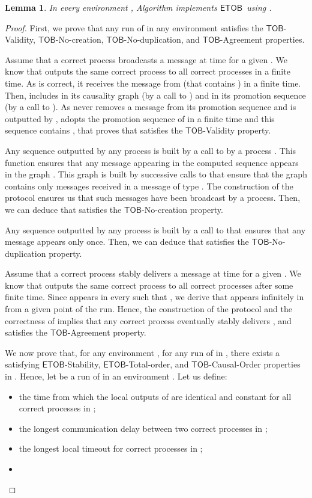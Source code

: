 \documentclass[11pt]{article}
\newtheorem{lemma}{Lemma}
\newcommand{\ETOB}{\ensuremath{\mathsf{ETOB}}}
\newcommand{\TOB}{\ensuremath{\mathsf{TOB}}}
\begin{document}
\begin{lemma}\label{lem:etob}
In every environment , Algorithm  implements \ETOB~using . 
\end{lemma}
\begin{proof}
First, we prove that any run  of  in any environment  satisfies the \TOB-Validity, \TOB-No-creation, \TOB-No-duplication, and \TOB-Agreement properties.

Assume that a correct process  broadcasts a message  at time  for a given . We know that  outputs the same correct process  to all correct processes in a finite time. As  is correct, it receives the message  from  (that contains ) in a finite time. Then,  includes  in its causality graph (by a call to ) and in its promotion sequence (by a call to ). As  never removes a message from its promotion sequence and is outputted by ,  adopts the promotion sequence of  in a finite time and this sequence contains , that proves that  satisfies the \TOB-Validity property.

Any sequence outputted by any process is built by a call to  by a process .  This function ensures that any message appearing in the computed sequence appears in the graph . This graph is built by successive calls to  that ensure that the graph contains only messages received in a message of type . The construction of the protocol ensures us that such messages have been broadcast by a process. Then, we can deduce that  satisfies the \TOB-No-creation property.

Any sequence outputted by any process is built by a call to  that ensures that any message appears only once. Then, we can deduce that  satisfies the \TOB-No-duplication property.

Assume that a correct process  stably delivers a message  at time 
for a given . We know that  outputs the same
correct process  to all correct processes after some finite
time. Since  appears in every  such that , we
derive that  appears infinitely in  from a given point
of the run. Hence, the construction of the protocol and the correctness
of  implies that any correct process eventually stably delivers
, and   satisfies the \TOB-Agreement property.

We now prove that, for any environment , for any run  of  in , there exists a  satisfying \ETOB-Stability, \ETOB-Total-order, and \TOB-Causal-Order properties in . Hence, let  be a run of  in an environment . Let us define:
\begin{itemize}
\item  the time from which the local outputs of  are identical and constant for all correct processes in ;
\item  the longest communication delay between two correct processes in ;
\item  the longest local timeout for correct processes in ;
\item 
\end{itemize}


\end{proof}
\end{document}

